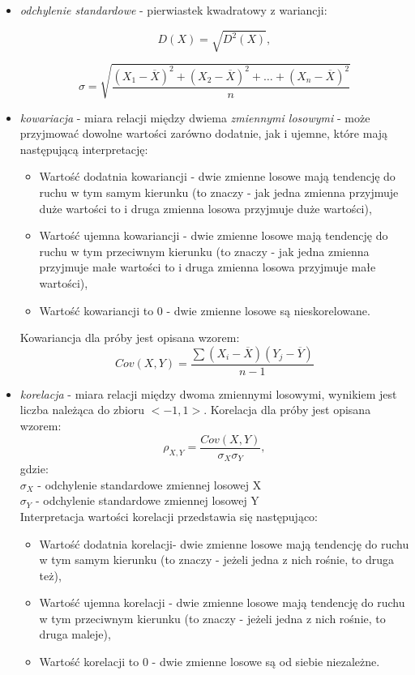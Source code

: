 \documentclass[magister]{dyplom}
\begin{document}
\begin{itemize}
\item \textit{odchylenie standardowe} - pierwiastek kwadratowy z wariancji: \newline

\begin{equation}
	D(X) = \sqrt{D^2(X)},
\end{equation}

\begin{equation}
	\sigma = \sqrt{\frac{(X_1 - \overline{X})^2 + (X_2 - \overline{X})^2 + \dots + (X_n - \overline{X})^2}{n}}
\end{equation}
\newpage
\item \textit{kowariacja} - miara relacji między dwiema \textit{zmiennymi losowymi} - może przyjmować dowolne wartości zarówno dodatnie, jak i ujemne, które mają następującą interpretację:
\begin{itemize}
	\item Wartość dodatnia kowariancji - dwie zmienne losowe mają tendencję do ruchu w tym samym kierunku (to znaczy - jak jedna zmienna przyjmuje duże wartości to i druga zmienna losowa przyjmuje duże wartości),
	\item Wartość ujemna kowariancji - dwie zmienne losowe mają tendencję do ruchu w tym przeciwnym kierunku (to znaczy - jak jedna zmienna przyjmuje małe wartości to i druga zmienna losowa przyjmuje małe wartości),
	\item Wartość kowariancji to 0 - dwie zmienne losowe są nieskorelowane.
\end{itemize}

Kowariancja dla próby jest opisana wzorem:
\begin{equation}
	Cov(X,Y) = \frac{\sum(X_i - \overline{X})(Y_j - \overline{Y})}{n - 1}
\end{equation}

\item \textit{korelacja} - miara relacji między dwoma zmiennymi losowymi, wynikiem jest liczba należąca do zbioru $<-1,1>$. Korelacja dla próby jest opisana wzorem:
\begin{equation}
	\rho_{X,Y} = \frac{Cov(X,Y)}{\sigma_X\sigma_Y},
\end{equation}
gdzie:\\
$\sigma_X$ - odchylenie standardowe zmiennej losowej X\\
$\sigma_Y$ - odchylenie standardowe zmiennej losowej Y\\

Interpretacja wartości korelacji przedstawia się następująco:
\begin{itemize}
	\item Wartość dodatnia korelacji- dwie zmienne losowe mają tendencję do ruchu w tym samym kierunku (to znaczy - jeżeli jedna z nich rośnie, to druga też),
	\item Wartość ujemna korelacji - dwie zmienne losowe mają tendencję do ruchu w tym przeciwnym kierunku (to znaczy - jeżeli jedna z nich rośnie, to druga maleje),
	\item Wartość korelacji to 0 - dwie zmienne losowe są od siebie niezależne.
\end{itemize}


\end{itemize}
\end{document}
